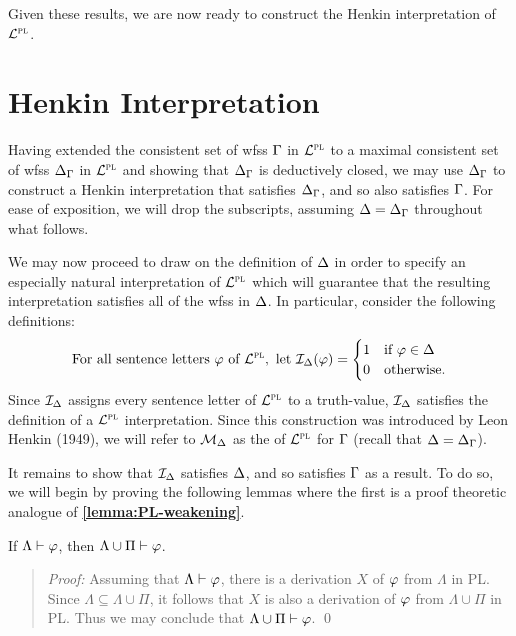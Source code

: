 Given these results, we are now ready to construct the Henkin interpretation of $\mathcal{L}^{\textsc{pl}}$.



\section{Henkin Interpretation}%
  \label{sub:HenkinInterpretation}

Having extended the consistent set of wfss $\Gamma$ in $\mathcal{L}^{\textsc{pl}}$ to a maximal consistent set of wfss $\Delta_{\Gamma}$ in $\mathcal{L}^{\textsc{pl}}$ and showing that $\Delta_{\Gamma}$ is deductively closed, we may use $\Delta_{\Gamma}$ to construct a Henkin interpretation that satisfies $\Delta_{\Gamma}$, and so also satisfies $\Gamma$.
For ease of exposition, we will drop the subscripts, assuming $\Delta=\Delta_{\Gamma}$ throughout what follows.

We may now proceed to draw on the definition of $\Delta$ in order to specify an especially natural interpretation of $\mathcal{L}^{\textsc{pl}}$ which will guarantee that the resulting interpretation satisfies all of the wfss in $\Delta$.
In particular, consider the following definitions:
  \[
    \text{For all sentence letters } \varphi \text{ of } \mathcal{L}^{\textsc{pl}}, \text{ let } \mathcal{I}_{\Delta}(\varphi) = 
      \begin{cases}
        1 & \text{if } \varphi \in \Delta\\
        0 & \text{otherwise.}
      \end{cases}
  \]
Since $\mathcal{I}_{\Delta}$ assigns every sentence letter of $\mathcal{L}^{\textsc{pl}}$ to a truth-value, $\mathcal{I}_{\Delta}$ satisfies the definition of a $\mathcal{L}^{\textsc{pl}}$ interpretation.
Since this construction was introduced by Leon Henkin (1949), we will refer to $\mathcal{M}_{\Delta}$ as the  of $\mathcal{L}^{\textsc{pl}}$ for $\Gamma$ (recall that $\Delta=\Delta_{\Gamma}$).

It remains to show that $\mathcal{I}_{\Delta}$ satisfies $\Delta$, and so satisfies $\Gamma$ as a result.
To do so, we will begin by proving the following lemmas where the first is a proof theoretic analogue of \textbf{\ref{lemma:PL-weakening}}.





\begin{Lthm} \label{lemma:PL-prweak}
  If $\Lambda\vdash\varphi$, then $\Lambda\cup\Pi\vdash\varphi$.
\end{Lthm} \vspace{-.2in}

\begin{quote} 
  \textit{Proof:} 
  Assuming that $\Lambda\vdash\varphi$, there is a derivation $X$ of $\varphi$ from $\Lambda$ in PL.
  Since $\Lambda\subseteq\Lambda\cup\Pi$, it follows that $X$ is also a derivation of $\varphi$ from $\Lambda\cup\Pi$ in PL.
  Thus we may conclude that $\Lambda\cup\Pi\vdash\varphi$. 
  \qed
\end{quote}







